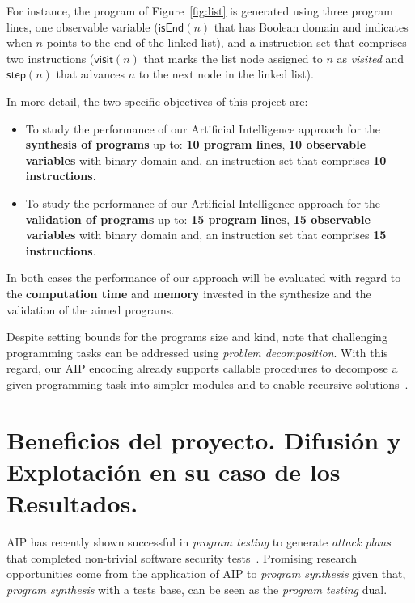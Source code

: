 \documentclass[10pt,a4paper]{paper}
\begin{document}
For instance, the program of Figure~\ref{fig:list} is generated using three program lines, one observable variable ($\mathsf{isEnd}(n)$ that has Boolean domain and indicates when $n$ points to the end of the linked list), and a instruction set that comprises two instructions ($\mathsf{visit}(n)$ that marks the list node assigned to $n$ as {\em visited} and $\mathsf{step}(n)$ that advances $n$ to the next node in the linked list).

In more detail, the two specific objectives of this project are:
\begin{itemize}
\item To study the performance of our Artificial Intelligence approach for the {\bf synthesis of programs} up to: {\bf 10 program lines}, {\bf 10 observable variables} with binary domain and, an instruction set that comprises {\bf 10 instructions}. 
\item To study the performance of our Artificial Intelligence approach for the {\bf validation of programs} up to: {\bf 15 program lines}, {\bf 15 observable variables} with binary domain and, an instruction set that comprises {\bf 15 instructions}. 
\end{itemize}
In both cases the performance of our approach will be evaluated with regard to the {\bf computation time} and {\bf memory} invested in the synthesize and the validation of the aimed programs.

Despite setting bounds for the programs size and kind, note that challenging programming tasks can be addressed using {\em problem decomposition}. With this regard, our AIP encoding already supports callable procedures to decompose a given programming task into simpler modules and to enable recursive solutions~\cite{sergio:aprograming:icaps16,sergio:aprograming:ijcai16}.


\newpage
\section{Beneficios del proyecto. Difusión y Explotación en su caso de los Resultados.}
\label{subsec:beneficios}
AIP has recently shown successful in {\em program testing} to generate {\em attack plans} that completed non-trivial software security tests~\cite{hoffmann2015simulated,steinmetz2016revisiting,shmaryahu2016constructing,steinmetz2016goal}. Promising research opportunities come from the application of AIP to {\em program synthesis} given that, {\em program synthesis} with a tests base, can be seen as the {\em program testing} dual.
\end{document}
